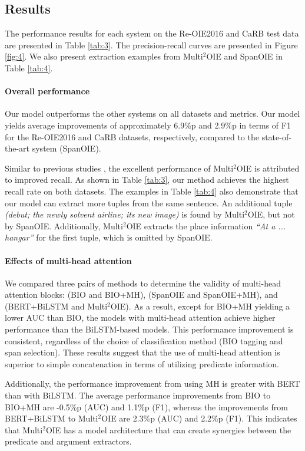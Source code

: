 \documentclass[11pt,a4paper]{article}
\begin{document}
\subsection{Results}
\label{subsection:results}
The performance results for each system on the Re-OIE2016 and CaRB test data are presented in Table \ref{tab:3}.
The precision-recall curves are presented in Figure \ref{fig:4}.
We also present extraction examples from Multi$^2$OIE and SpanOIE in Table \ref{tab:4}.

\paragraph{Overall performance}
Our model outperforms the other systems on all datasets and metrics.
Our model yields average improvements of approximately 6.9\%p and 2.9\%p in terms of F1 for the Re-OIE2016 and CaRB datasets, respectively, compared to the state-of-the-art system (SpanOIE).

Similar to previous studies \citep{stanovsky-etal-2018-supervised,Zhan2019SpanMF}, the excellent performance of Multi$^2$OIE is attributed to improved recall.
As shown in Table \ref{tab:3}, our method achieves the highest recall rate on both datasets.
The examples in Table \ref{tab:4} also demonstrate that our model can extract more tuples from the same sentence.
An additional tuple \emph{(debut; the newly solvent airline; its new image)} is found by Multi$^2$OIE, but not by SpanOIE.
Additionally, Multi$^2$OIE extracts the place information \emph{``At a ... hangar''} for the first tuple, which is omitted by SpanOIE.

\paragraph{Effects of multi-head attention}
We compared three pairs of methods to determine the validity of multi-head attention blocks: (BIO and BIO+MH), (SpanOIE and SpanOIE+MH), and (BERT+BiLSTM and Multi$^2$OIE).
As a result, except for BIO+MH yielding a lower AUC than BIO,
the models with multi-head attention achieve higher performance than the BiLSTM-based models.
This performance improvement is consistent, regardless of the choice of classification method (BIO tagging and span selection).
These results suggest that the use of multi-head attention is superior to simple concatenation in terms of utilizing predicate information.

Additionally, the performance improvement from using MH is greater with BERT than with BiLSTM.
The average performance improvements from BIO to BIO+MH are -0.5\%p (AUC) and 1.1\%p (F1), whereas the improvements from BERT+BiLSTM to Multi$^2$OIE are 2.3\%p (AUC) and 2.2\%p (F1).
This indicates that Multi$^2$OIE has a model architecture that can create synergies between the predicate and argument extractors.
\end{document}
